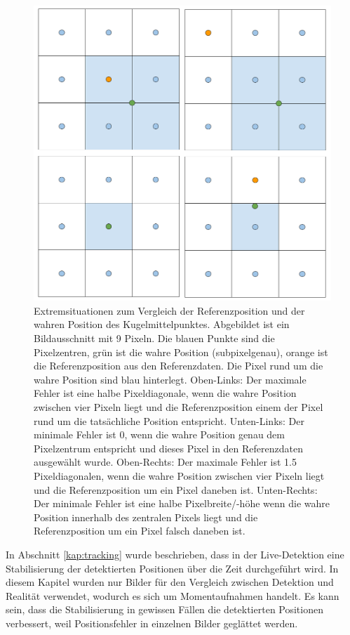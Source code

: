 \begin{figure}[h!]
    \begin{center}
        \includegraphics[width=0.5\linewidth]{../common/04_results/resources/detektion_min_und_max_fehler.png}
    \end{center}
    \caption{
        Extremsituationen zum Vergleich der Referenzposition und der wahren Position des Kugelmittelpunktes.
        Abgebildet ist ein Bildausschnitt mit 9 Pixeln. Die blauen Punkte sind die Pixelzentren, grün ist die wahre Position (subpixelgenau), orange ist die Referenzposition aus den Referenzdaten.
        Die Pixel rund um die wahre Position sind blau hinterlegt.
        Oben-Links: Der maximale Fehler ist eine halbe Pixeldiagonale, wenn die wahre Position zwischen vier Pixeln liegt und die Referenzposition einem der Pixel rund um die tatsächliche Position entspricht.
        Unten-Links: Der minimale Fehler ist $0$, wenn die wahre Position genau dem Pixelzentrum entspricht und dieses Pixel in den Referenzdaten ausgewählt wurde.
        Oben-Rechts: Der maximale Fehler ist 1.5 Pixeldiagonalen, wenn die wahre Position zwischen vier Pixeln liegt und die Referenzposition um ein Pixel daneben ist.
        Unten-Rechts: Der minimale Fehler ist eine halbe Pixelbreite/-höhe wenn die wahre Position innerhalb des zentralen Pixels liegt und die Referenzposition um ein Pixel falsch daneben ist.
    }
    \label{fig:detektion_resultate_min_max_fehler_referenzdaten}
\end{figure}

In Abschnitt \ref{kap:tracking} wurde beschrieben, dass in der Live-Detektion eine Stabilisierung der detektierten Positionen
über die Zeit durchgeführt wird.
In diesem Kapitel wurden nur Bilder für den Vergleich zwischen Detektion und Realität verwendet, wodurch es sich um Momentaufnahmen handelt.
Es kann sein, dass die Stabilisierung in gewissen Fällen die detektierten Positionen verbessert,
weil Positionsfehler in einzelnen Bilder geglättet werden.


